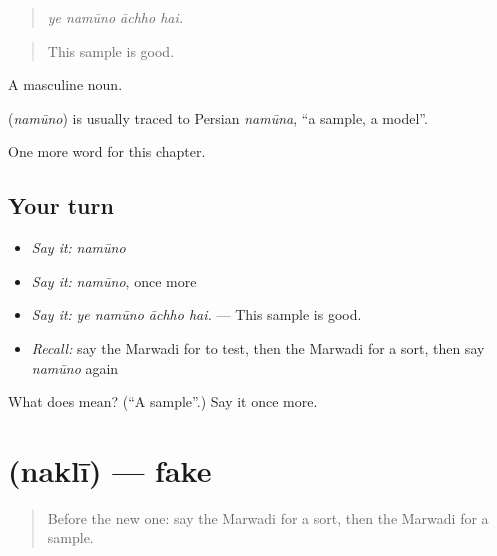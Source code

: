 \begin{quote}
   
\end{quote}

\begin{quote}
\emph{ye namūno āchho hai.}
\end{quote}

\begin{quote}
This sample is good.
\end{quote}

A masculine noun.

\begin{cousinweb}
\textbf{} (\emph{namūno}) is usually traced to Persian \emph{namūna}, \textquotedblleft{}a sample, a model\textquotedblright{}.
\end{cousinweb}

\begin{grammarlens}[title={What you've built}]
One more word for this chapter.
\end{grammarlens}

\subsection*{Your turn}
\begin{itemize}
\raggedright
  \item \emph{Say it:} \emph{namūno}
  \item \emph{Say it:} \emph{namūno}, once more
  \item \emph{Say it:} \emph{ye namūno āchho hai.} — This sample is good.
  \item \emph{Recall:} say the Marwadi for to test, then the Marwadi for a sort, then say \emph{namūno} again
\end{itemize}

\begin{tcolorbox}[breakable,colback=teal!4,colframe=teal!35!black,title={Before you move on}]
What does  mean? (\textquotedblleft{}A sample\textquotedblright{}.) Say it once more.
\end{tcolorbox}
\section[\texorpdfstring{\mw{नकली} (naklī)}{नकली (naklī)}]{ (naklī) — fake}

\label{lesson:MW-C210-nakli}



\begin{quote}
Before the new one: say the Marwadi for a sort, then the Marwadi for a sample.
\end{quote}

